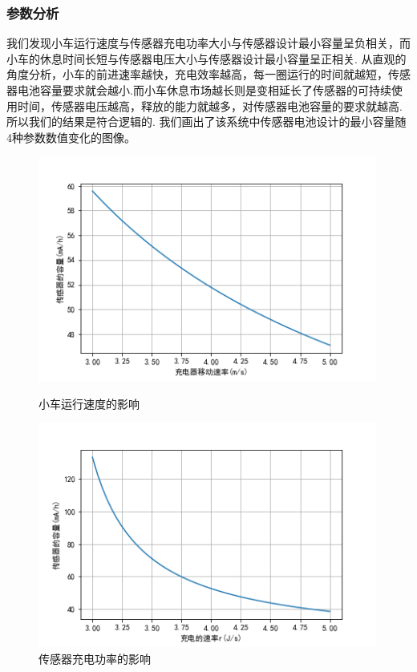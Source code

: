 \documentclass{whutmod}
\begin{document}
\subsubsection{参数分析}
我们发现小车运行速度与传感器充电功率大小与传感器设计最小容量呈负相关，而小车的休息时间长短与传感器电压大小与传感器设计最小容量呈正相关.
从直观的角度分析，小车的前进速率越快，充电效率越高，每一圈运行的时间就越短，传感器电池容量要求就会越小.而小车休息市场越长则是变相延长了传感器的可持续使用时间，传感器电压越高，释放的能力就越多，对传感器电池容量的要求就越高.所以我们的结果是符合逻辑的.
我们画出了该系统中传感器电池设计的最小容量随4种参数数值变化的图像。

\begin{figure}[H]	
	\begin{minipage}[t]{0.48\textwidth}
		\centering
		\includegraphics[width=0.99\textwidth]{充电车移动速度.png}	
		
		\caption{小车运行速度的影响}
	\end{minipage}
	\qquad
	\begin{minipage}[t]{0.48\textwidth}
		\centering
		\includegraphics[width=0.99\textwidth]{充电速度.png}
		
		\caption{传感器充电功率的影响}	
	\end{minipage}
	\label{fig:enhance}
	
\end{figure}
\end{document}
